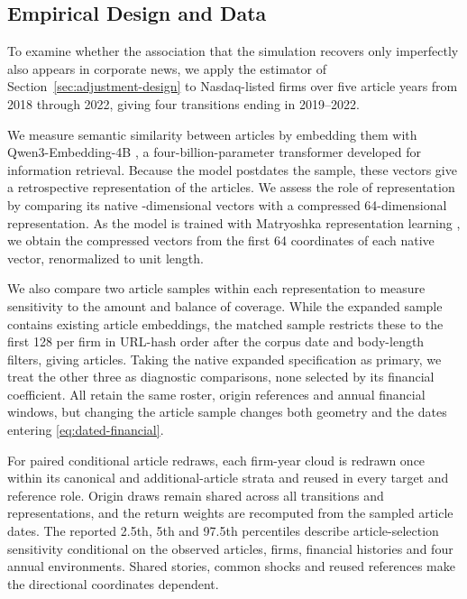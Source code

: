 \subsection{Empirical Design and Data}\label{sec:data}

To examine whether the association that the simulation recovers only imperfectly
also appears in corporate news, we apply the estimator of
Section~\ref{sec:adjustment-design} to 
Nasdaq-listed firms over five article years from 2018 through 2022, giving four
transitions ending in 2019--2022.

We measure semantic similarity between articles by embedding them with
Qwen3-Embedding-4B \citep{qwen3_embedding_2025}, a four-billion-parameter
transformer developed for information retrieval.
Because the model postdates the sample, these vectors give a retrospective
representation of the articles.
We assess the role of representation by comparing its native
-dimensional vectors with a compressed
64-dimensional representation.
As the model is trained with Matryoshka representation learning
\citep{kusupati_matryoshka_2022}, we obtain the compressed vectors from the first
64 coordinates of each native vector, renormalized to unit length.

We also compare two article samples within each representation to measure
sensitivity to the amount and balance of coverage.
While the expanded sample contains  existing
article embeddings, the matched sample restricts these to the first 128 per firm
in URL-hash order after the corpus date and body-length filters, giving
 articles.
Taking the native expanded specification as primary, we treat the other three as
diagnostic comparisons, none selected by its financial coefficient.
All retain the same roster, origin references and annual financial windows,
but changing the article sample changes both geometry and the dates entering
\eqref{eq:dated-financial}.

For  paired conditional article redraws, each firm-year
cloud is redrawn once within its canonical and additional-article strata and
reused in every target and reference role.
Origin draws remain shared across all transitions and representations, and
the return weights are recomputed from the sampled article dates.
The reported 2.5th, 5th and 97.5th percentiles describe article-selection
sensitivity conditional on the observed articles, firms, financial histories
and four annual environments.
Shared stories, common shocks and reused references make the
 directional coordinates dependent.
